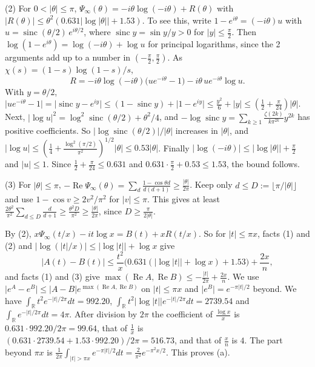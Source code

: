 (2) For $0<\lvert\theta\rvert\le\pi$, $\Psi_\infty(\theta)=-i\theta\log(-i\theta)+R(\theta)$
with $\lvert R(\theta)\rvert\le\theta^2(0.631\lvert\log\lvert\theta\rvert\rvert+1.53)$.
To see this, write $1-e^{i\theta}=(-i\theta)u$ with
$u=\operatorname{sinc}(\theta/2)\,e^{i\theta/2}$, where
$\operatorname{sinc}y=\sin y/y>0$ for $\lvert y\rvert\le\frac\pi2$. Then
$\log(1-e^{i\theta})=\log(-i\theta)+\log u$ for principal logarithms, since
the 2 arguments add up to a number in $(-\frac\pi2,\frac\pi2)$. As
$\chi(s)=(1-s)\log(1-s)/s$,
\[
 R=-i\theta\log(-i\theta)\bigl(ue^{-i\theta}-1\bigr)-i\theta\,ue^{-i\theta}\log u .
\]
With $y=\theta/2$,
$\lvert ue^{-i\theta}-1\rvert=\lvert\operatorname{sinc}y-e^{iy}\rvert\le(1-\operatorname{sinc}y)+\lvert1-e^{iy}\rvert\le\frac{y^2}6+\lvert y\rvert\le(\frac12+\frac\pi{24})\lvert\theta\rvert$.
Next, $\lvert\log u\rvert^2=\log^2\operatorname{sinc}(\theta/2)+\theta^2/4$,
and $-\log\operatorname{sinc}y=\sum_{k\ge1}\frac{\zeta(2k)}{k\pi^{2k}}y^{2k}$ has
positive coefficients. So $\lvert\log\operatorname{sinc}(\theta/2)\rvert/\lvert\theta\rvert$
increases in $\lvert\theta\rvert$, and
$\lvert\log u\rvert\le(\frac14+\frac{\log^2(\pi/2)}{\pi^2})^{1/2}\lvert\theta\rvert\le0.53\lvert\theta\rvert$.
Finally $\lvert\log(-i\theta)\rvert\le\lvert\log\lvert\theta\rvert\rvert+\frac\pi2$
and $\lvert u\rvert\le1$. Since $\frac12+\frac\pi{24}\le0.631$ and
$0.631\cdot\frac\pi2+0.53\le1.53$, the bound follows.

(3) For $\lvert\theta\rvert\le\pi$,
$-\operatorname{Re}\Psi_\infty(\theta)=\sum_d\frac{1-\cos\theta d}{d(d+1)}\ge\frac{\lvert\theta\rvert}{2\pi}$.
Keep only $d\le D:=\lfloor\pi/\lvert\theta\rvert\rfloor$ and use
$1-\cos v\ge2v^2/\pi^2$ for $\lvert v\rvert\le\pi$. This gives at least
$\frac{2\theta^2}{\pi^2}\sum_{d\le D}\frac d{d+1}\ge\frac{\theta^2D}{\pi^2}\ge\frac{\lvert\theta\rvert}{2\pi}$,
since $D\ge\frac\pi{2\lvert\theta\rvert}$.

By (2), $x\Psi_\infty(t/x)-it\log x=B(t)+xR(t/x)$. So for
$\lvert t\rvert\le\pi x$, facts (1) and (2) and
$\lvert\log(\lvert t\rvert/x)\rvert\le\lvert\log\lvert t\rvert\rvert+\log x$ give
\[
 \lvert A(t)-B(t)\rvert\le\frac{t^2}x\bigl(0.631(\lvert\log\lvert t\rvert\rvert+\log x)+1.53\bigr)+\frac{2x}n,
\]
and facts (1) and (3) give
$\max(\operatorname{Re}A,\operatorname{Re}B)\le-\frac{\lvert t\rvert}{2\pi}+\frac{2x}n$.
We use $\lvert e^A-e^B\rvert\le\lvert A-B\rvert e^{\max(\operatorname{Re}A,\operatorname{Re}B)}$
on $\lvert t\rvert\le\pi x$ and $\lvert e^B\rvert=e^{-\pi\lvert t\rvert/2}$
beyond. We have $\int_{\mathbb R}t^2e^{-\lvert t\rvert/2\pi}dt=992.20$,
$\int_{\mathbb R}t^2\lvert\log\lvert t\rvert\rvert e^{-\lvert t\rvert/2\pi}dt=2739.54$
and $\int_{\mathbb R}e^{-\lvert t\rvert/2\pi}dt=4\pi$. After division by
$2\pi$ the coefficient of $\frac{\log x}x$ is
$0.631\cdot992.20/2\pi=99.64$, that of $\frac1x$ is
$(0.631\cdot2739.54+1.53\cdot992.20)/2\pi=516.73$, and that of $\frac xn$
is $4$. The part beyond $\pi x$ is
$\frac1{2\pi}\int_{\lvert t\rvert>\pi x}e^{-\pi\lvert t\rvert/2}dt=\frac2{\pi^2}e^{-\pi^2x/2}$.
This proves (a).

